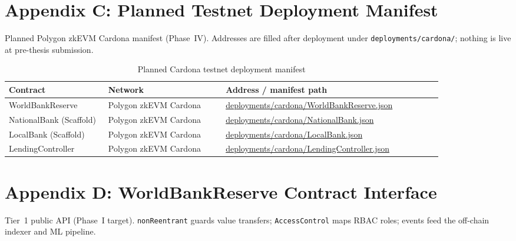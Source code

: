 \documentclass[12pt, a4paper]{report}
\newcommand{\tableheadcolor}{\rowcolor{TableHeadBg}}
\newcommand{\tableheadfont}{\bfseries}
\begin{document}
\chapter*{Appendix C: Planned Testnet Deployment Manifest}
{}

Planned Polygon zkEVM Cardona manifest (Phase~IV). Addresses are filled after deployment under \texttt{deployments/cardona/}; nothing is live at pre-thesis submission.

\begin{table}[H]
\centering
\caption[Planned Cardona testnet deployment manifest]{Planned Cardona testnet deployment manifest}
\label{tab:cardona-manifest}
\footnotesize
\begin{tabular}{@{}%
 >{\raggedright\arraybackslash}p{0.22\linewidth}%
 >{\raggedright\arraybackslash}p{0.26\linewidth}%
 >{\raggedright\arraybackslash}p{0.48\linewidth}@{}}
\toprule
\tableheadcolor
\tableheadfont Contract & \tableheadfont Network & \tableheadfont Address / manifest path \\
\midrule
WorldBankReserve & Polygon zkEVM Cardona & \url{deployments/cardona/WorldBankReserve.json} \\
NationalBank (Scaffold) & Polygon zkEVM Cardona & \url{deployments/cardona/NationalBank.json} \\
LocalBank (Scaffold) & Polygon zkEVM Cardona & \url{deployments/cardona/LocalBank.json} \\
LendingController & Polygon zkEVM Cardona & \url{deployments/cardona/LendingController.json} \\
\bottomrule
\end{tabular}
\end{table}

\chapter*{Appendix D: WorldBankReserve Contract Interface}
{}

Tier~1 public API (Phase~I target). \texttt{nonReentrant} guards value transfers; \texttt{AccessControl} maps RBAC roles; events feed the off-chain indexer and ML pipeline.
\end{document}
